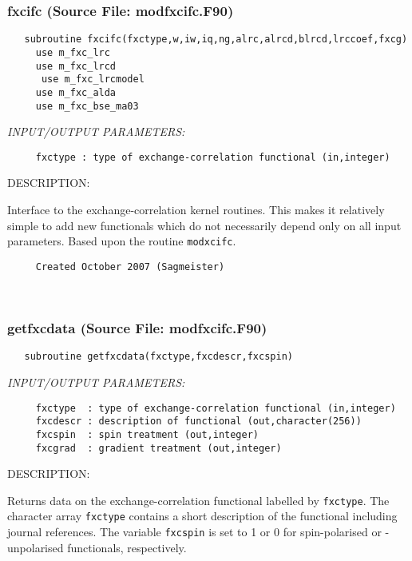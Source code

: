 \documentclass[11pt]{article}
\begin{document}
\subsubsection{fxcifc (Source File: modfxcifc.F90)}


\begin{verbatim}   subroutine fxcifc(fxctype,w,iw,iq,ng,alrc,alrcd,blrcd,lrccoef,fxcg)
     use m_fxc_lrc
     use m_fxc_lrcd
      use m_fxc_lrcmodel
     use m_fxc_alda
     use m_fxc_bse_ma03\end{verbatim}{\em INPUT/OUTPUT PARAMETERS:}
\begin{verbatim}     fxctype : type of exchange-correlation functional (in,integer)\end{verbatim}
{\sf DESCRIPTION:\\ }


     Interface to the exchange-correlation kernel routines. This makes it 
     relatively
     simple to add new functionals which do not necessarily depend only on
     all input parameters. Based upon the routine {\tt modxcifc}.
  
\begin{verbatim}     Created October 2007 (Sagmeister)\end{verbatim}
 
 
\mbox{}\hrulefill\ 
 
\subsubsection{getfxcdata (Source File: modfxcifc.F90)}


\begin{verbatim}   subroutine getfxcdata(fxctype,fxcdescr,fxcspin)\end{verbatim}{\em INPUT/OUTPUT PARAMETERS:}
\begin{verbatim}     fxctype  : type of exchange-correlation functional (in,integer)
     fxcdescr : description of functional (out,character(256))
     fxcspin  : spin treatment (out,integer)
     fxcgrad  : gradient treatment (out,integer)\end{verbatim}
{\sf DESCRIPTION:\\ }


     Returns data on the exchange-correlation functional labelled by
     {\tt fxctype}. The character array {\tt fxctype} contains a short
     description
     of the functional including journal references. The variable 
     {\tt fxcspin} is
     set to 1 or 0 for spin-polarised or -unpolarised functionals,
     respectively.
  
\end{document}
